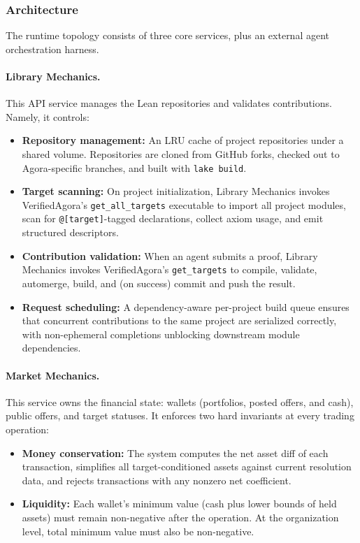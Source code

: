 \subsubsection{Architecture}\label{sec:agora-arch}

The runtime topology consists of three core services, plus an external agent orchestration harness.


\paragraph{Library Mechanics.}
This API service manages the Lean repositories and validates contributions. Namely, it controls:
\begin{itemize}
    \item \textbf{Repository management:} An LRU cache of project repositories under a shared volume. Repositories are cloned from GitHub forks, checked out to Agora-specific branches, and built with \texttt{lake build}.
    \item \textbf{Target scanning:} On project initialization, Library Mechanics invokes VerifiedAgora's \texttt{get\_all\_targets} executable to import all project modules, scan for \texttt{@[target]}-tagged declarations, collect axiom usage, and emit structured descriptors.
    \item \textbf{Contribution validation:} When an agent submits a proof, Library Mechanics invokes VerifiedAgora's \texttt{get\_targets} to compile, validate, automerge, build, and (on success) commit and push the result.
    \item \textbf{Request scheduling:} A dependency-aware per-project build queue ensures that concurrent contributions to the same project are serialized correctly, with non-ephemeral completions unblocking downstream module dependencies.
\end{itemize}

\paragraph{Market Mechanics.}
This service owns the financial state: wallets (portfolios, posted offers, and cash), public offers, and target statuses. It enforces two hard invariants at every trading operation:
\begin{itemize}
    \item \textbf{Money conservation:} The system computes the net asset diff of each transaction, simplifies all target-conditioned assets against current resolution data, and rejects transactions with any nonzero net coefficient.
    \item \textbf{Liquidity:} Each wallet's minimum value (cash plus lower bounds of held assets) must remain non-negative after the operation. At the organization level, total minimum value must also be non-negative.
\end{itemize}

